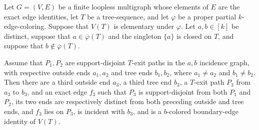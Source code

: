 \begin{lemma}
Let $G=(V,E)$ be a finite loopless multigraph whose elements of $E$ are
the exact edge identities, let $T$ be a tree-sequence, and let $\varphi$
be a proper partial $k$-edge-coloring.  Suppose that $V(T)$ is elementary
under $\varphi$.  Let $a,b\in[k]$ be distinct, suppose that
$a\in\overline\varphi(T)$ and the singleton $\{a\}$ is closed on $T$,
and suppose that $b\notin\overline\varphi(T)$.

Assume that $P_1,P_2$ are support-disjoint $T$-exit paths in the
$a,b$ incidence graph, with respective outside ends $a_1,a_2$ and tree
ends $b_1,b_2$, where $a_1\ne a_2$ and $b_1\ne b_2$.  Then there are a
third outside end $a_3$, a third tree end $b_3$, a $T$-exit path $P_3$
from $a_3$ to $b_3$, and an exact edge $f_3$ such that $P_3$ is
support-disjoint from both $P_1$ and $P_2$, its two ends are respectively
distinct from both preceding outside and tree ends, and $f_3$ lies on
$P_3$, is incident with $b_3$, and is a $b$-colored boundary-edge identity
of $V(T)$.
\end{lemma}
